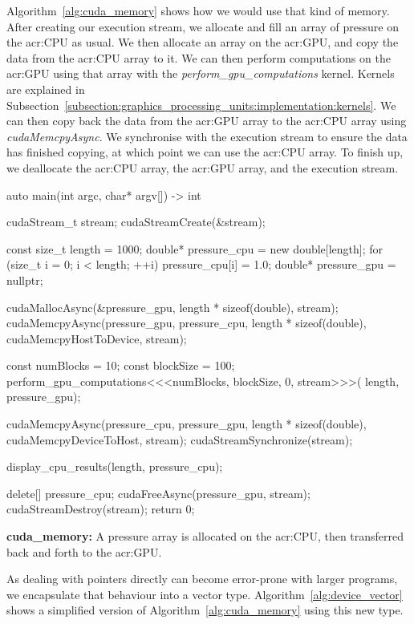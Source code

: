 Algorithm~\ref{alg:cuda_memory} shows how we would use that kind of memory. After creating our
execution stream, we allocate and fill an array of pressure on the \acrshort{acr:CPU} as usual. We
then allocate an array on the \acrshort{acr:GPU}, and copy the data from the \acrshort{acr:CPU}
array to it. We can then perform computations on the \acrshort{acr:GPU} using that array with the
\textit{perform\_gpu\_computations} kernel. Kernels are explained in
Subsection~\ref{subsection:graphics_processing_units:implementation:kernels}. We can then copy back
the data from the \acrshort{acr:GPU} array to the \acrshort{acr:CPU} array using
\textit{cudaMemcpyAsync}. We synchronise with the execution stream to ensure the data has finished
copying, at which point we can use the \acrshort{acr:CPU} array. To finish up, we deallocate the
\acrshort{acr:CPU} array, the \acrshort{acr:GPU} array, and the execution stream.

\begin{algorithm}[H]
    \begin{cuda}
		auto main(int argc, char* argv[]) -> int {
			cudaStream_t stream;
			cudaStreamCreate(&stream); 

			const size_t length = 1000;
			double* pressure_cpu = new double[length];
			for (size_t i = 0; i < length; ++i){
				pressure_cpu[i] = 1.0;
			}
			double* pressure_gpu = nullptr;

			cudaMallocAsync(&pressure_gpu, length * sizeof(double), stream);
			cudaMemcpyAsync(pressure_gpu, pressure_cpu, length * sizeof(double), 
                cudaMemcpyHostToDevice, stream);

			const numBlocks = 10;
			const blockSize = 100;
			perform_gpu_computations<<<numBlocks, blockSize, 0, stream>>>(
				length, pressure_gpu);
			
			cudaMemcpyAsync(pressure_cpu, pressure_gpu, length * sizeof(double), 
                cudaMemcpyDeviceToHost, stream);
			cudaStreamSynchronize(stream);

			display_cpu_results(length, pressure_cpu);

			delete[] pressure_cpu;
			cudaFreeAsync(pressure_gpu, stream);
			cudaStreamDestroy(stream);
			return 0;
		}\end{cuda}
\caption{\textbf{cuda\_memory:} A pressure array is allocated on the \acrshort{acr:CPU}, then transferred back and forth to the \acrshort{acr:GPU}.}\label{alg:cuda_memory}
\end{algorithm}

As dealing with pointers directly can become error-prone with larger programs, we encapsulate that
behaviour into a vector type. Algorithm~\ref{alg:device_vector} shows a simplified version of
Algorithm~\ref{alg:cuda_memory} using this new type.

